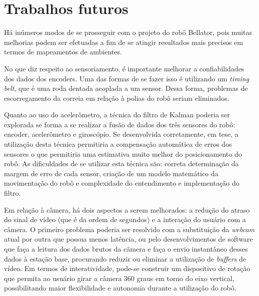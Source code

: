 \chapter{Trabalhos futuros}
Há inúmeros modos de se prosseguir com o projeto do robô Bellator, pois muitas melhorias podem ser efetuadas a fim de se atingir resultados mais precisos em termos de mapeamentos de ambientes.

No que diz respeito ao sensoriamento, é importante melhorar a confiabilidades dos dados dos encoders. Uma das formas de se fazer isso é utilizando um \textit{timing belt}, que é uma roda dentada acoplada a um sensor. Dessa forma, problemas de escorregamento da correia em relação à polias do robô seriam eliminados.

Quanto ao uso do acelerômetro, a técnica do filtro de Kalman poderia ser explorada se forma a se realizar a fusão de dados dos três sensores do robô: encoder, acelerômetro e giroscópio. Se desenvolvida corretamente, em tese, a utilização desta técnica permitiria a compensação automática de erros dos sensores o que permitiria uma estimativa muito melhor do posicionamento do robô. As dificuldades de se utilizar esta técnica são: correta determinação da margem de erro de cada sensor, criação de um modelo matemático da movimentação do robô e complexidade do entendimento e implementação do filtro.

Em relação à câmera, há dois aspectos a serem melhorados: a redução do atraso do sinal de vídeo (que é da ordem de segundos) e a interação do usuário com a câmera. O primeiro problema poderia ser resolvido com a substituição da \textit{webcam} atual por outra que possua menos latência, ou pelo desenvolvimentos de software que faça a leitura dos dados brutos da câmera e faça o envio instantâneo desses dados à estação base, procurando reduzir ou eliminar a utilização de \textit{buffers} de vídeo. Em termos de interatividade, pode-se construir um dispositivo de rotação que permita ao usuário girar a câmera 360 graus em torno do eixo vertical, possibilitando maior flexibilidade e autonomia durante a utilização do robô.
